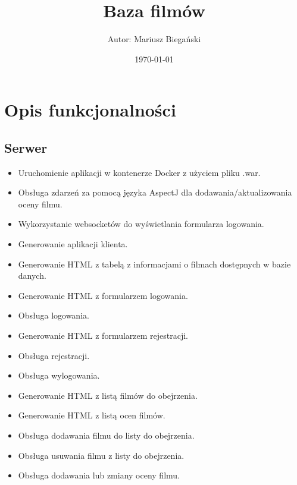 \documentclass{article}
\title{Baza filmów}
\author{Autor: Mariusz Biegański}
\date{\today}
\begin{document}
\maketitle

\section{Opis funkcjonalności}
\subsection{Serwer}
\begin{itemize}
	\item Uruchomienie aplikacji w kontenerze Docker z użyciem pliku .war.
	\item Obsługa zdarzeń za pomocą języka AspectJ dla dodawania/aktualizowania oceny filmu.
	\item Wykorzystanie websocketów do wyświetlania formularza logowania.
	\item Generowanie aplikacji klienta.
	\item Generowanie HTML z tabelą z informacjami o filmach dostępnych w bazie danych.
	\item Generowanie HTML z formularzem logowania.
	\item Obsługa logowania.
	\item Generowanie HTML z formularzem rejestracji.
	\item Obsługa rejestracji.
	\item Obsługa wylogowania.
	\item Generowanie HTML z listą filmów do obejrzenia.
	\item Generowanie HTML z listą ocen filmów.
	\item Obsługa dodawania filmu do listy do obejrzenia.
	\item Obsługa usuwania filmu z listy do obejrzenia.
	\item Obsługa dodawania lub zmiany oceny filmu.
\end{itemize}
\end{document}
